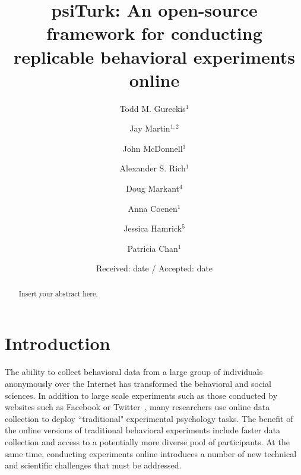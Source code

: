 \documentclass[twocolumn]{svjour3}          %
\begin{document}
\title{\textsf{psiTurk}: An open-source framework for conducting replicable behavioral experiments online}

\author{Todd M. Gureckis$^1$ \and
	Jay Martin$^{1,2}$ \and
	John McDonnell$^3$ \and
	Alexander S. Rich$^1$ \and
	Doug Markant$^4$  \and
	Anna Coenen$^1$ \and
	Jessica Hamrick$^5$ \and
	Patricia Chan$^1$
}




\date{Received: date / Accepted: date}

\maketitle

\begin{abstract}
Insert your abstract here.
\end{abstract}


\section{Introduction}


The ability to collect behavioral data from a large group of individuals
anonymously over the Internet has transformed the behavioral and social
sciences.  In addition to large scale experiments such as those
conducted by websites such as Facebook or 
Twitter~\citep[e.g.,][]{Chen:2013pb,Kramer:2014dq,Wu:2011sp}, many researchers
use online data collection to deploy ``traditional" experimental psychology
tasks.  The benefit of the online versions of traditional behavioral experiments include 
faster data collection and access to a potentially more diverse pool of participants. 
At the same time, conducting experiments online introduces a number of new 
technical and scientific challenges that must be addressed.
\end{document}
